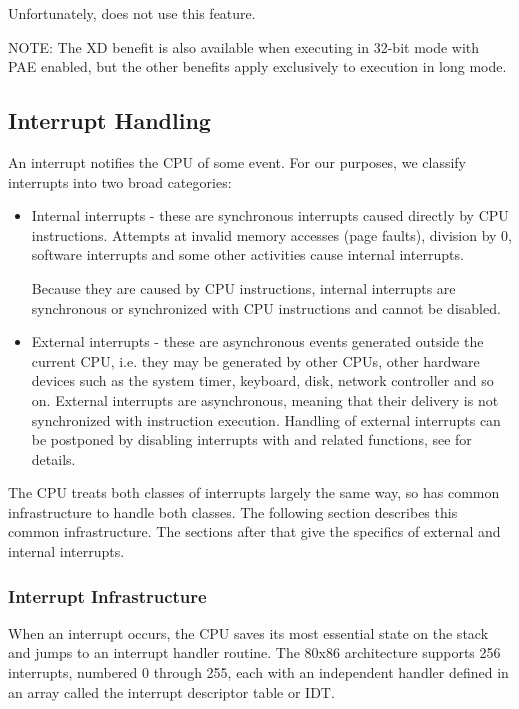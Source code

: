 \begin{appendices}
\begin{enumerate}
	Unfortunately, \projectname does not use this feature.

\end{enumerate}

NOTE: The XD benefit is also available when executing in 32-bit mode with PAE enabled, but the other
benefits apply exclusively to execution in long mode.

\subsection{Interrupt Handling}
\label{sect:InterruptHandling}

An interrupt notifies the CPU of some event. For our purposes, we classify interrupts into two broad
categories:
\begin{itemize}
	\item Internal interrupts - these are synchronous interrupts caused directly by CPU instructions.
Attempts at invalid memory accesses (page faults), division by 0, software interrupts and some other
activities cause internal interrupts.

	Because they are caused by CPU instructions, internal interrupts are synchronous or synchronized
with CPU instructions and cannot be disabled.

	\item External interrupts - these are asynchronous events generated outside the current CPU, i.e.
they may be generated by other CPUs, other hardware devices such as the system timer, keyboard, disk,
network controller and so on. External interrupts are asynchronous, meaning that their delivery is
not synchronized with instruction execution. Handling of external interrupts can be postponed by
disabling interrupts with  and related functions, see
 for details.
\end{itemize}

The CPU treats both classes of interrupts largely the same way, so \projectname has common 
infrastructure to handle both classes. The following section describes this common infrastructure.
The sections after that give the specifics of external and internal interrupts.

\subsubsection{Interrupt Infrastructure}

When an interrupt occurs, the CPU saves its most essential state on the stack and jumps to an 
interrupt handler routine. The 80x86 architecture supports 256 interrupts, numbered 0 through 255,
each with an independent handler defined in an array called the interrupt descriptor table or IDT.


\end{appendices}
